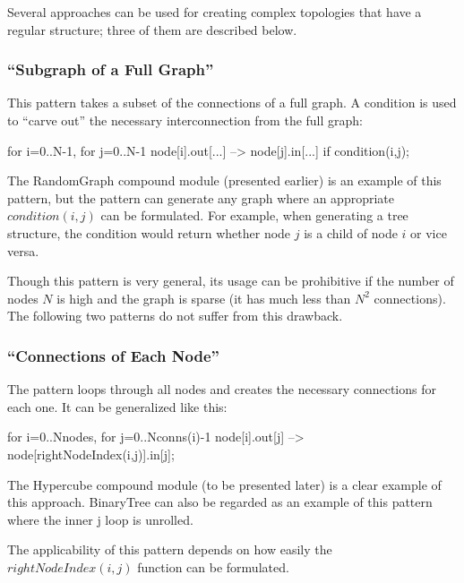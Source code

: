
Several approaches can be used for creating complex topologies that have a
regular structure; three of them are described below.


\subsubsection{``Subgraph of a Full Graph''}
\label{sec:ned-lang:subgraph-of-full-graph}


This pattern takes a subset of the connections of a full graph.  A
condition is used to ``carve out'' the necessary interconnection from
the full graph:

\begin{ned}
for i=0..N-1, for j=0..N-1 {
    node[i].out[...] --> node[j].in[...] if condition(i,j);
}
\end{ned}

The RandomGraph compound module (presented earlier) is an example of
this pattern, but the pattern can generate any graph where an
appropriate $condition(i,j)$ can be formulated. For example,
when generating a tree structure, the condition
would return whether node $j$ is a child of node $i$ or
vice versa.

Though this pattern is very general, its usage can be prohibitive if
the number of nodes $N$ is high and the graph is sparse (it has
much less than $N^2$ connections). The following
two patterns do not suffer from this drawback.


\subsubsection{``Connections of Each Node''}
\label{sec:ned-lang:connections-of-each-node}

The pattern loops through all nodes and creates the necessary
connections for each one. It can be generalized like this:

\begin{ned}
for i=0..Nnodes, for j=0..Nconns(i)-1 {
    node[i].out[j] --> node[rightNodeIndex(i,j)].in[j];
}
\end{ned}

The Hypercube compound module (to be
presented later) is a clear example of this approach. BinaryTree can
also be regarded as an example of this pattern where the inner j loop
is unrolled.

The applicability of this pattern depends on how easily the $rightNodeIndex(i,j)$
function can be formulated.



